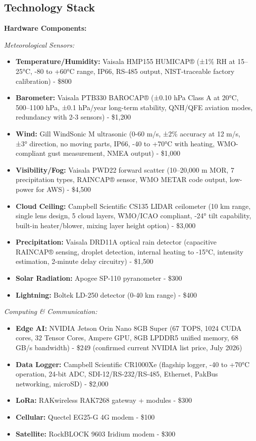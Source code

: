 \subsection{Technology Stack}

\textbf{Hardware Components:}

\textit{Meteorological Sensors:}
\begin{itemize}
    \item \textbf{Temperature/Humidity:} Vaisala HMP155 HUMICAP® (±1\% RH at 15--25°C, -80 to +60°C range, IP66, RS-485 output, NIST-traceable factory calibration) - \$800
    \item \textbf{Barometer:} Vaisala PTB330 BAROCAP® (±0.10 hPa Class A at 20°C, 500--1100 hPa, ±0.1 hPa/year long-term stability, QNH/QFE aviation modes, redundancy with 2-3 sensors) - \$1,200
    \item \textbf{Wind:} Gill WindSonic M ultrasonic (0-60 m/s, ±2\% accuracy at 12 m/s, ±3° direction, no moving parts, IP66, -40 to +70°C with heating, WMO-compliant gust measurement, NMEA output) - \$1,000
    \item \textbf{Visibility/Fog:} Vaisala PWD22 forward scatter (10--20,000 m MOR, 7 precipitation types, RAINCAP® sensor, WMO METAR code output, low-power for AWS) - \$4,500
    \item \textbf{Cloud Ceiling:} Campbell Scientific CS135 LIDAR ceilometer (10 km range, single lens design, 5 cloud layers, WMO/ICAO compliant, -24° tilt capability, built-in heater/blower, mixing layer height option) - \$3,000
    \item \textbf{Precipitation:} Vaisala DRD11A optical rain detector (capacitive RAINCAP® sensing, droplet detection, internal heating to -15°C, intensity estimation, 2-minute delay circuitry) - \$1,500
    \item \textbf{Solar Radiation:} Apogee SP-110 pyranometer - \$300
    \item \textbf{Lightning:} Boltek LD-250 detector (0-40 km range) - \$400
\end{itemize}

\textit{Computing \& Communication:}
\begin{itemize}
    \item \textbf{Edge AI:} NVIDIA Jetson Orin Nano 8GB Super (67 TOPS, 1024 CUDA cores, 32 Tensor Cores, Ampere GPU, 8GB LPDDR5 unified memory, 68 GB/s bandwidth) - \$249 (confirmed current NVIDIA list price, July 2026)
    \item \textbf{Data Logger:} Campbell Scientific CR1000Xe (flagship logger, -40 to +70°C operation, 24-bit ADC, SDI-12/RS-232/RS-485, Ethernet, PakBus networking, microSD) - \$2,000
    \item \textbf{LoRa:} RAKwireless RAK7268 gateway + modules - \$300
    \item \textbf{Cellular:} Quectel EG25-G 4G modem - \$100
    \item \textbf{Satellite:} RockBLOCK 9603 Iridium modem - \$300
\end{itemize}

